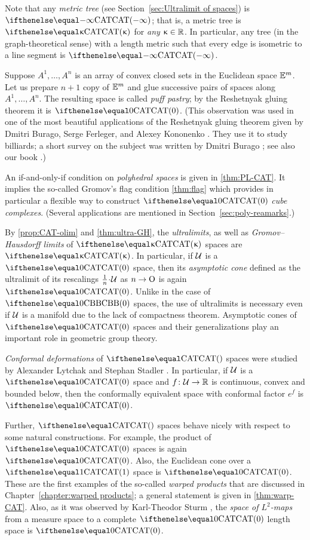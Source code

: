 Note that any \textit{metric tree} (see Section~\ref{sec:Ultralimit of spaces}) is $\CAT{-\infty}$;
that is, a metric tree is $\CAT{\kappa}$ for \textit{any} $\kappa\in\RR$.
In particular, any tree (in the graph-theoretical sense) with a length metric such that every edge is isometric to a line segment is $\CAT{-\infty}$.

Suppose $A^1, \dots, A^n$ is an array of convex closed sets in the Euclidean space $\mathbb{E}^m$.
Let us prepare $n+1$ copy of $\mathbb{E}^m$ and glue successive pairs of spaces along $A^1, \dots, A^n$.
The resulting space is called \textit{puff pastry};
by the Reshetnyak gluing theorem it is $\CAT0$.
(This observation was used in one of the most beautiful applications of the Reshetnyak gluing theorem given by Dmitri Burago,  Serge Ferleger,
and Alexey Kononenko \cite{burago-ferleger-kononenko1998-1,burago-ferleger-kononenko1998-2,burago-ferleger-kononenko1998-3,burago-ferleger-kononenko1998-4}.
They use it to study billiards; a short survey on the subject was written by Dmitri Burago \cite{burago-1998};
see also our book \cite{alexander-kapovitch-petrunin-CAT}.)

An if-and-only-if condition on \textit{polyhedral spaces} is given in \ref{thm:PL-CAT}.
It implies the so-called Gromov's flag condition \ref{thm:flag} which provides in particular a flexible way to construct $\CAT0$ \textit{cube complexes}.
(Several applications are mentioned in Section~\ref{sec:poly-reamarks}.)

By \ref{prop:CAT-olim} and \ref{thm:ultra-GH}, the \textit{ultralimits}, as well as \textit{Gromov--Hausdorff limits} of $\CAT\kappa$ spaces are $\CAT\kappa$.
In particular, if  $\mathcal{U}$ is a $\CAT{0}$ space, then its \textit{asymptotic cone}   defined as  the ultralimit of its rescalings $\tfrac1n\cdot \spc{U}$ as $n\to \o$ is again  $\CAT{0}$.
Unlike in the case of $\Alex{0}$ spaces, the use of ultralimits is necessary even if $\mathcal{U}$ is a manifold due to the lack of compactness theorem.
Asymptotic cones of $\CAT{0}$ spaces and their generalizations play an important role in geometric group theory.

\textit{Conformal deformations} of $\CAT{}$ spaces were studied by Alexander Lytchak and Stephan Stadler \cite{lytchak-stadler}.
In particular, if $\mathcal{U}$ is a $\CAT0$ space and $f\:\spc{U}\to\RR$ is  continuous, convex
and bounded below,
then the conformally equivalent space with conformal factor $e^f$ is $\CAT0$.

Further, $\CAT{}$ spaces behave nicely with respect to some natural constructions.
For example, the product of $\CAT{0}$ spaces is again $\CAT{0}$.
Also, the Euclidean cone over a $\CAT{1}$ space is  $\CAT{0}$.
These are the first examples of the so-called \textit{warped products} that are discussed in Chapter~\ref{chapter:warped products};
a general statement is given in \ref{thm:warp-CAT}.
Also, as it was observed by Karl-Theodor Sturm \cite[Prop. 3.10]{sturm2003},
the \textit{space of $L^2$-maps} from a measure space to a complete $\CAT0$ length space is $\CAT0$.

